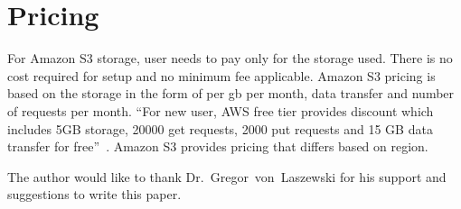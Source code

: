 \section{Pricing}

For Amazon S3 storage, user needs to pay only for the storage used. There is no
cost required for setup and no minimum fee applicable. Amazon S3 pricing is
based on the storage in the form of per gb per month, data transfer and number
of requests per month.
``For new user, AWS free tier provides discount which includes 5GB storage,
20000 get requests, 2000 put requests and 15 GB data transfer for
free''~\cite{hid-sp18-420-amazon-S3-pricing}. Amazon S3 provides pricing that
differs based on region.

\begin{acks}

  The author would like to thank Dr.~Gregor~von~Laszewski for his
  support and suggestions to write this paper.

\end{acks}


 
